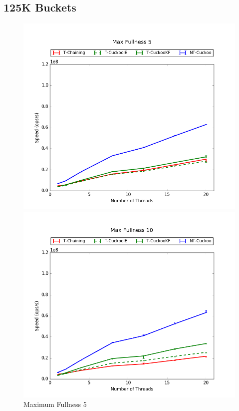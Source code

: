 \subsection{125K Buckets}
\begin{figure}[H]
    \centering
	\begin{minipage}{0.45\textwidth}\includegraphics[width=\textwidth]{maps/5HM125K:F34,I33,E33.png} 
        \caption*{Maximum Fullness 5}
    \end{minipage}
	\begin{minipage}{0.45\textwidth}\includegraphics[width=\textwidth]{maps/10HM125K:F34,I33,E33.png} 

\end{minipage}
\end{figure}
